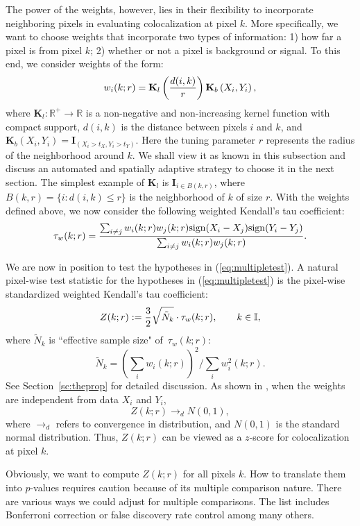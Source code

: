 \documentclass[10pt,twocolumn,twoside]{IEEEtran}
\def\II{{\mathbb I}}
\def\sign{{\rm sign}}
\def\RR{\mathbb{R}}
\def\bK{\mathbf K}
\begin{document}
The power of the weights, however, lies in their flexibility to incorporate neighboring pixels in evaluating colocalization at pixel $k$. More specifically, we want to choose weights that incorporate two types of information: 1) how far a pixel is from pixel $k$; 2) whether or not a pixel is background or signal. To this end, we consider weights of the form:
\begin{equation}
\label{eq:nonadpwt}
w_i(k;r)=\bK_l\left(d(i,k)\over r\right) \bK_b\left(X_i,Y_i\right),
\end{equation}
where $\bK_l: \RR^+\to\RR$ is a non-negative and non-increasing kernel function with compact support, $d(i,k)$ is the distance between pixels $i$ and $k$, and $\bK_b\left(X_i,Y_i\right)=\mathbf{I}_{(X_i>t_X,Y_i>t_Y)}$. Here the tuning parameter $r$ represents the radius of the neighborhood around $k$. We shall view it as known in this subsection and discuss an automated and spatially adaptive strategy to choose it in the next section. The simplest example of $\bK_l$ is $\mathbf{I}_{i\in B(k,r)}$, where $B(k,r)=\{i: d(i,k)\le r\}$ is the neighborhood of $k$ of size $r$. With the weights defined above, we now consider the following weighted Kendall's tau coefficient:
$$
\tau_w(k;r)={\sum_{i\ne j}w_i(k;r)w_j(k;r)\sign(X_i-X_j)\sign(Y_i-Y_j)\over \sum_{i\neq j}w_i(k;r)w_j(k;r)}.
$$

We are now in position to test the hypotheses in (\ref{eq:multipletest}). A natural pixel-wise test statistic for the hypotheses in (\ref{eq:multipletest}) is the pixel-wise standardized weighted Kendall's tau coefficient:
$$
Z(k;r):={3\over 2}\sqrt{\tilde{N}_k} \cdot \tau_w(k;r),\qquad k\in\II,
$$
where $\tilde{N}_k$ is ``effective sample size" of\ $\tau_w(k;r)$: 
\begin{equation}
\label{eq:sampsize}
\tilde{N}_k= \left(\sum_{i}w_i(k;r)\right)^2\bigg/\sum_{i}w^2_i(k;r).
\end{equation}
See Section~\ref{sc:theprop} for detailed discussion. As shown in \cite{Shieh1998}, when the weights are independent from data $X_i$ and $Y_i$,
$$
Z(k;r)\to_{d} N(0,1),
$$
where $\to_d$ refers to convergence in distribution, and $N(0,1)$ is the standard normal distribution. Thus, $Z(k;r)$ can be viewed as a $z$-score for colocalization at pixel $k$.

Obviously, we want to compute $Z(k;r)$ for all pixels $k$. How to translate them into $p$-values requires caution because of its multiple comparison nature. There are various ways we could adjust for multiple comparisons. The list includes Bonferroni correction \citep[see][]{dunn1961} or false discovery rate control \citep[see][]{Benjamini1995,Efron2001} among many others. 
\end{document}

